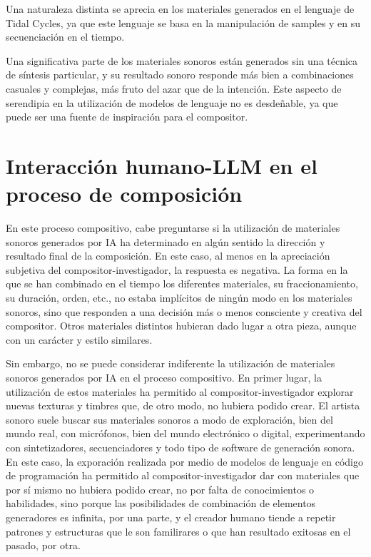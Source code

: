 Una naturaleza distinta se aprecia en los materiales generados en el lenguaje de Tidal Cycles, ya que este lenguaje se basa en la manipulación de samples y en su secuenciación en el tiempo. 

Una significativa parte de los materiales sonoros están generados sin una técnica de síntesis particular, y su resultado sonoro responde más bien a combinaciones casuales y complejas, más fruto del azar que de la intención. Este aspecto de serendipia en la utilización de modelos de lenguaje no es desdeñable, ya que puede ser una fuente de inspiración para el compositor.

\section{Interacción humano-LLM en el proceso de composición}

En este proceso compositivo, cabe preguntarse si la utilización de materiales sonoros generados por IA ha determinado en algún sentido la dirección y resultado final de la composición. En este caso, al menos en la apreciación subjetiva del compositor-investigador, la respuesta es negativa. La forma en la que se han combinado en el tiempo los diferentes materiales, su fraccionamiento, su duración, orden, etc., no estaba implícitos de ningún modo en los materiales sonoros, sino que responden a una decisión más o menos consciente y creativa del compositor. Otros materiales distintos hubieran dado lugar a otra pieza, aunque con un carácter y estilo similares. 

Sin embargo, no se puede considerar indiferente la utilización de materiales sonoros generados por IA en el proceso compositivo. En primer lugar, la utilización de estos materiales ha permitido al compositor-investigador explorar nuevas texturas y timbres que, de otro modo, no hubiera podido crear. El artista sonoro suele buscar sus materiales sonoros a modo de exploración, bien del mundo real, con micrófonos, bien del mundo electrónico o digital, experimentando con sintetizadores, secuenciadores y todo tipo de software de generación sonora. En este caso, la exporación realizada por medio de modelos de lenguaje en código de programación ha permitido al compositor-investigador dar con materiales que por sí mismo no hubiera podido crear, no por falta de conocimientos o habilidades, sino porque las posibilidades de combinación de elementos generadores es infinita, por una parte, y el creador humano tiende a repetir patrones y estructuras que le son familirares o que han resultado exitosas en el pasado, por otra.

